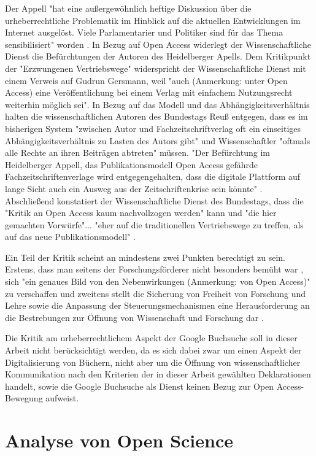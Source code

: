 Der Appell "hat eine außergewöhnlich heftige Diskussion über die urheberrechtliche Problematik im Hinblick auf die aktuellen Entwicklungen im Internet ausgelöst. Viele Parlamentarier und Politiker sind für das Thema sensibilisiert" worden \cite{WD_bundestag_2009}. In Bezug auf Open Access widerlegt der Wissenschaftliche Dienst die Befürchtungen der Autoren des Heidelberger Apells. Dem Kritikpunkt der "Erzwungenen Vertriebswege" widerspricht der Wissenschaftliche Dienst mit einem Verweis auf Gudrun Gersmann, weil "auch (Anmerkung: unter Open Access) eine Veröffentlichung bei einem Verlag mit einfachem Nutzungsrecht weiterhin möglich sei". In Bezug auf das Modell und das Abhängigkeitsverhältnis halten die wissenschaftlichen Autoren des Bundestags Reuß entgegen, dass es im bisherigen System "zwischen Autor und Fachzeitschriftverlag oft ein einseitiges Abhängigkeitsverhältnis zu Lasten des Autors gibt" und Wissenschaftler "oftmals alle Rechte an ihren Beiträgen abtreten" \cite{WD_bundestag_2009} müssen. "Der Befürchtung im Heidelberger Appell, das Publikationsmodell Open Access gefährde Fachzeitschriftenverlage wird entgegengehalten, dass die digitale Plattform auf lange Sicht auch ein Ausweg aus der Zeitschriftenkrise sein könnte" \cite{WD_bundestag_2009}. Abschließend konstatiert der Wissenschaftliche Dienst des Bundestags, dass die "Kritik an Open Access kaum nachvollzogen werden" kann und "die hier gemachten Vorwürfe"... "eher auf die traditionellen Vertriebswege zu treffen, als auf das neue Publikationsmodell" \cite{WD_bundestag_2009}.

Ein Teil der Kritik scheint an mindestens zwei Punkten berechtigt zu sein. Erstens, dass man seitens der Forschungsförderer nicht besonders bemüht war \cite{suchen}, sich "ein genaues Bild von den Nebenwirkungen (Anmerkung: von Open Access)" \cite{Reuss_2009} zu verschaffen und zweitens stellt die Sicherung von Freiheit von Forschung und Lehre sowie die Anpassung der Steuerungsmechanismen eine Herausforderung an die Bestrebungen zur Öffnung von Wissenschaft und Forschung dar \cite{suchen}.

Die Kritik am urheberrechtlichem Aspekt der Google Buchsuche soll in dieser Arbeit nicht berücksichtigt werden, da es sich dabei zwar um einen Aspekt der Digitalisierung von Büchern, nicht aber um die Öffnung von wissenschaftlicher Kommunikation nach den Kriterien der in dieser Arbeit gewählten Deklarationen handelt, sowie die Google Buchsuche als Dienst keinen Bezug zur Open Access-Bewegung aufweist.

\section{Analyse von Open Science}

